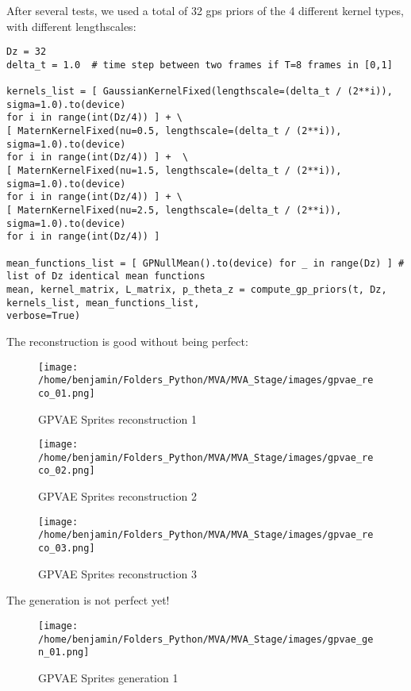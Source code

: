 After several tests, we used a total of 32 \glspl{gp} priors of the 4 different kernel types, with different lengthscales:
\begin{verbatim}
Dz = 32
delta_t = 1.0  # time step between two frames if T=8 frames in [0,1]

kernels_list = [ GaussianKernelFixed(lengthscale=(delta_t / (2**i)), sigma=1.0).to(device) 
for i in range(int(Dz/4)) ] + \
[ MaternKernelFixed(nu=0.5, lengthscale=(delta_t / (2**i)), sigma=1.0).to(device) 
for i in range(int(Dz/4)) ] +  \
[ MaternKernelFixed(nu=1.5, lengthscale=(delta_t / (2**i)), sigma=1.0).to(device) 
for i in range(int(Dz/4)) ] + \
[ MaternKernelFixed(nu=2.5, lengthscale=(delta_t / (2**i)), sigma=1.0).to(device) 
for i in range(int(Dz/4)) ]

mean_functions_list = [ GPNullMean().to(device) for _ in range(Dz) ] # list of Dz identical mean functions
mean, kernel_matrix, L_matrix, p_theta_z = compute_gp_priors(t, Dz, kernels_list, mean_functions_list, 
verbose=True)
\end{verbatim}

The reconstruction is good without being perfect:
\begin{figure}[H]
    \centering
    \texttt{[image: /home/benjamin/Folders\_Python/MVA/MVA\_Stage/images/gpvae\_reco\_01.png]}
    \caption{GPVAE Sprites reconstruction 1}
    \label{fig:GPVAE Sprites reconstruction 1}
\end{figure}

\begin{figure}[H]
    \centering
    \texttt{[image: /home/benjamin/Folders\_Python/MVA/MVA\_Stage/images/gpvae\_reco\_02.png]}
    \caption{GPVAE Sprites reconstruction 2}
    \label{fig:GPVAE Sprites reconstruction 2}
\end{figure}

\begin{figure}[H]
    \centering
    \texttt{[image: /home/benjamin/Folders\_Python/MVA/MVA\_Stage/images/gpvae\_reco\_03.png]}
    \caption{GPVAE Sprites reconstruction 3}
    \label{fig:GPVAE Sprites reconstruction 3}
\end{figure}

The generation is not perfect yet!

\begin{figure}[H]
    \centering
    \texttt{[image: /home/benjamin/Folders\_Python/MVA/MVA\_Stage/images/gpvae\_gen\_01.png]}
    \caption{GPVAE Sprites generation 1}
    \label{fig:GPVAE Sprites generation 1}
\end{figure}